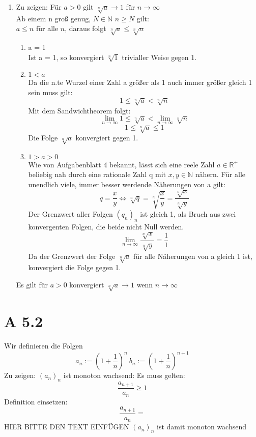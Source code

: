 \documentclass{article}
\begin{document}
\begin{enumerate}[ label = (\alph*)]
        \item Zu zeigen: Für \(a > 0\) gilt \( \sqrt[n]{a} \to 1 \) für \( n \to \infty \) \\
        Ab einem n groß genug, \(N \in \mathbb{N}\) \(n \geq N\) gilt: \\
        \(a \leq n\) für alle \(n\), daraus folgt \(\sqrt[n]{a} \leq \sqrt[n]{n}\) \\
        \begin{enumerate}[ label = \arabic*. Fall ]
            \item a = 1 \\
            Ist a = 1, so konvergiert \(\sqrt[n]{1}\) trivialler Weise gegen 1.
            
            \item \(1 < a\) \\
            Da die n.te Wurzel einer Zahl a größer als 1 auch immer größer gleich 1 sein muss gilt:
            \[1 \leq \sqrt[n]{a} < \sqrt[n]{n} \]
            Mit dem Sandwichtheorem folgt:
            \[\lim_{n \to \infty} 1 \leq \sqrt[n]{a} < \lim_{n \to \infty} \sqrt[n]{n} \]
            \[1 \leq \sqrt[n]{a} \leq 1\]
            Die Folge \(\sqrt[n]{a}\) konvergiert gegen 1.
    
            \item \(1 > a > 0 \) \\
            Wie von Aufgabenblatt 4 bekannt, lässt sich eine reele Zahl \(a \in \mathbb{R}^+\) beliebig nah
            durch eine rationale Zahl q mit \(x, y \in \mathbb{N} \) nähern.
            Für alle unendlich viele, immer besser werdende Näherungen von a gilt:
            \[q = \frac{x}{y} \Leftrightarrow \sqrt[n]{q} = \sqrt[n]{\frac{x}{y}} = \frac{\sqrt[n]{x}}{\sqrt[n]{y}}\]
            Der Grenzwert aller Folgen \({(q_n)_n}\) ist gleich 1, als Bruch aus zwei konvergenten Folgen, die beide nicht Null werden.
            \[\lim_{n \to \infty} \frac{\sqrt[n]{x}}{\sqrt[n]{y}} = \frac{1}{1} \]
            Da der Grenzwert der Folge \(\sqrt[n]{a}\) für alle Näherungen von a gleich 1 ist, konvergiert die Folge gegen 1.
        \end{enumerate}
    
        Es gilt für \(a > 0\) konvergiert \(\sqrt[n]{a} \to 1\) wenn \(n \to \infty\) \\
    \end{enumerate}

    \section*{A 5.2}
    Wir definieren die Folgen
    \[ a_n := { \left( 1 + \frac{1}{n} \right) }^n \ b_n := { \left( 1 + \frac{1}{n} \right) }^{n+1} \]
    Zu zeigen: \( {(a_n)}_n \) ist monoton wachsend:
    Es muss gelten:
    \[ \frac{ a_{n+1} }{ a_n } \geq 1 \]
    Definition einsetzen:
    \[ \frac{ a_{n+1} }{ a_n  }  = \]
    HIER BITTE DEN TEXT EINFÜGEN
    \( {(a_n)}_n \) ist damit monoton wachsend \\
\end{document}
